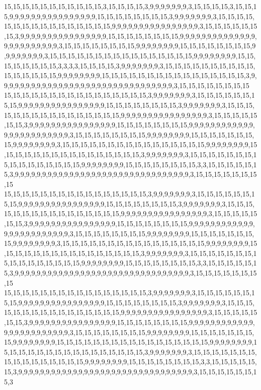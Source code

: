 15,15,15,15,15,15,15,15,15,15,15,3,15,15,15,15,3,9,9,9,9,9,9,9,3,15,15,15,15,3,15,15,15,9,9,9,9,9,9,9,9,9,9,9,9,9,9,9,9,15,15,15,15,15,15,15,15,3,9,9,9,9,9,9,9,3,15,15,15,15,15,15,15,15,15,15,15,15,15,15,15,15,9,9,9,9,9,9,9,9,9,9,9,9,9,9,9,9,3,15,15,15,15,15,15,15,3,9,9,9,9,9,9,9,9,9,9,9,9,9,9,9,9,15,15,15,15,15,15,15,15,9,9,9,9,9,9,9,9,9,9,9,9,9,9,9,9,9,9,9,9,9,9,9,9,3,15,15,15,15,15,15,15,15,9,9,9,9,9,9,9,9,15,15,15,15,15,15,15,15,9,9,9,9,9,9,9,9,3,15,15,15,15,15,15,15,15,15,15,15,15,15,15,15,15,9,9,9,9,9,9,9,9,15,15,15,15,15,15,15,15,3,3,3,3,15,15,15,15,3,9,9,9,9,9,9,9,3,15,15,15,15,15,15,15,15,15,15,15,15,15,15,15,15,9,9,9,9,9,9,9,9,15,15,15,15,15,15,15,15,15,15,15,15,15,15,15,15,3,9,9,9,9,9,9,9,9,9,9,9,9,9,9,9,9,9,9,9,9,9,9,9,9,9,9,9,9,9,9,9,9,3,15,15,15,15,15,15,15,15
15,15,15,15,15,15,15,15,15,15,15,15,15,15,15,15,3,9,9,9,9,9,9,9,3,15,15,15,15,15,15,15,15,9,9,9,9,9,9,9,9,9,9,9,9,9,9,9,9,15,15,15,15,15,15,15,15,3,9,9,9,9,9,9,9,3,15,15,15,15,15,15,15,15,15,15,15,15,15,15,15,15,9,9,9,9,9,9,9,9,9,9,9,9,9,9,9,9,3,15,15,15,15,15,15,15,3,9,9,9,9,9,9,9,9,9,9,9,9,9,9,9,9,15,15,15,15,15,15,15,15,9,9,9,9,9,9,9,9,9,9,9,9,9,9,9,9,9,9,9,9,9,9,9,9,3,15,15,15,15,15,15,15,15,9,9,9,9,9,9,9,9,15,15,15,15,15,15,15,15,9,9,9,9,9,9,9,9,3,15,15,15,15,15,15,15,15,15,15,15,15,15,15,15,15,9,9,9,9,9,9,9,9,15,15,15,15,15,15,15,15,15,15,15,15,15,15,15,15,3,9,9,9,9,9,9,9,3,15,15,15,15,15,15,15,15,15,15,15,15,15,15,15,15,9,9,9,9,9,9,9,9,15,15,15,15,15,15,15,15,3,3,15,15,15,15,15,15,3,9,9,9,9,9,9,9,9,9,9,9,9,9,9,9,9,9,9,9,9,9,9,9,9,9,9,9,9,9,9,9,9,3,15,15,15,15,15,15,15,15
15,15,15,15,15,15,15,15,15,15,15,15,15,15,15,15,3,9,9,9,9,9,9,9,3,15,15,15,15,15,15,15,15,9,9,9,9,9,9,9,9,9,9,9,9,9,9,9,9,15,15,15,15,15,15,15,15,3,9,9,9,9,9,9,9,3,15,15,15,15,15,15,15,15,15,15,15,15,15,15,15,15,9,9,9,9,9,9,9,9,9,9,9,9,9,9,9,9,3,15,15,15,15,15,15,15,3,9,9,9,9,9,9,9,9,9,9,9,9,9,9,9,9,15,15,15,15,15,15,15,15,9,9,9,9,9,9,9,9,9,9,9,9,9,9,9,9,9,9,9,9,9,9,9,9,3,15,15,15,15,15,15,15,15,9,9,9,9,9,9,9,9,15,15,15,15,15,15,15,15,9,9,9,9,9,9,9,9,3,15,15,15,15,15,15,15,15,15,15,15,15,15,15,15,15,9,9,9,9,9,9,9,9,15,15,15,15,15,15,15,15,15,15,15,15,15,15,15,15,3,9,9,9,9,9,9,9,3,15,15,15,15,15,15,15,15,15,15,15,15,15,15,15,15,9,9,9,9,9,9,9,9,15,15,15,15,15,15,15,15,3,3,15,15,15,15,15,15,3,9,9,9,9,9,9,9,9,9,9,9,9,9,9,9,9,9,9,9,9,9,9,9,9,9,9,9,9,9,9,9,9,3,15,15,15,15,15,15,15,15
15,15,15,15,15,15,15,15,15,15,15,15,15,15,15,15,3,9,9,9,9,9,9,9,3,15,15,15,15,15,15,15,15,9,9,9,9,9,9,9,9,9,9,9,9,9,9,9,9,15,15,15,15,15,15,15,15,3,9,9,9,9,9,9,9,3,15,15,15,15,15,15,15,15,15,15,15,15,15,15,15,15,9,9,9,9,9,9,9,9,9,9,9,9,9,9,9,9,3,15,15,15,15,15,15,15,3,9,9,9,9,9,9,9,9,9,9,9,9,9,9,9,9,15,15,15,15,15,15,15,15,9,9,9,9,9,9,9,9,9,9,9,9,9,9,9,9,9,9,9,9,9,9,9,9,3,15,15,15,15,15,15,15,15,9,9,9,9,9,9,9,9,15,15,15,15,15,15,15,15,9,9,9,9,9,9,9,9,15,15,15,15,15,15,15,15,15,15,15,15,15,15,15,15,15,9,9,9,9,9,9,9,9,15,15,15,15,15,15,15,15,15,15,15,15,15,15,15,15,3,9,9,9,9,9,9,9,3,15,15,15,15,15,15,15,15,15,15,15,15,15,15,15,15,9,9,9,9,9,9,9,9,15,15,15,15,15,15,15,15,3,3,15,15,15,15,15,15,3,9,9,9,9,9,9,9,9,9,9,9,9,9,9,9,9,9,9,9,9,9,9,9,9,9,9,9,9,9,9,9,9,3,15,15,15,15,15,15,15,3
